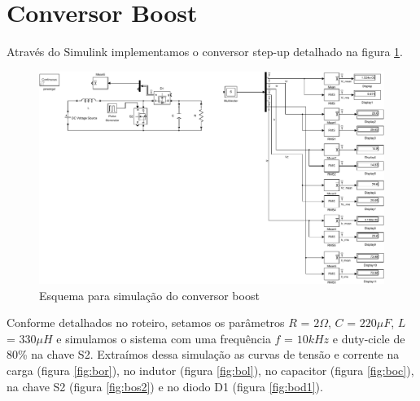\documentclass{article}
\begin{document}
\section{Conversor Boost}
Através do Simulink implementamos o conversor step-up detalhado na figura \ref{fig:bosim}.
\begin{figure}[H]
	\centering
	\includegraphics[width=\linewidth]{matlab/boost/bsim}
	\caption{Esquema para simulação do conversor boost}
	\label{fig:bosim}
\end{figure}
Conforme detalhados no roteiro, setamos os parâmetros $R$ = $2\Omega$, $C$ = $220\mu F$, $L$ = $330\mu H$ e simulamos o sistema com uma frequência $f$ = $10kHz$ e duty-cicle de 80\% na chave S2.
Extraímos dessa simulação as curvas de tensão e corrente na carga (figura \ref{fig:bor}), no indutor (figura \ref{fig:bol}), no capacitor (figura \ref{fig:boc}), na chave S2 (figura \ref{fig:bos2}) e no diodo D1 (figura \ref{fig:bod1}).
\end{document}
